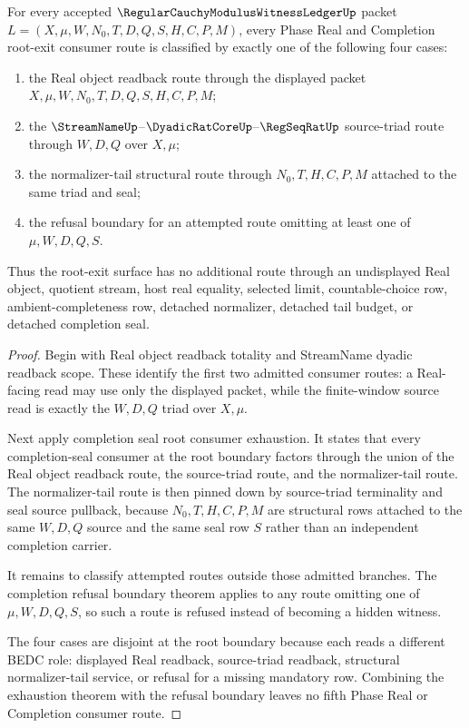 \begin{theorem}
\label{thm:regular-cauchy-modulus-witness-ledger-root-exit-partition}
For every accepted $\RegularCauchyModulusWitnessLedgerUp$ packet $L=(X,\mu,W,N_0,T,D,Q,S,H,C,P,M)$, every Phase Real and Completion root-exit consumer route is classified by exactly one of the following four cases:
\begin{enumerate}
\item the Real object readback route through the displayed packet $X,\mu,W,N_0,T,D,Q,S,H,C,P,M$;
\item the $\StreamNameUp$--$\DyadicRatCoreUp$--$\RegSeqRatUp$ source-triad route through $W,D,Q$ over $X,\mu$;
\item the normalizer-tail structural route through $N_0,T,H,C,P,M$ attached to the same triad and seal;
\item the refusal boundary for an attempted route omitting at least one of $\mu,W,D,Q,S$.
\end{enumerate}
Thus the root-exit surface has no additional route through an undisplayed Real object, quotient stream, host real equality, selected limit, countable-choice row, ambient-completeness row, detached normalizer, detached tail budget, or detached completion seal.
\end{theorem}
\begin{proof}
Begin with Real object readback totality and StreamName dyadic readback scope. These identify the first two admitted consumer routes: a Real-facing read may use only the displayed packet, while the finite-window source read is exactly the $W,D,Q$ triad over $X,\mu$.

Next apply completion seal root consumer exhaustion. It states that every completion-seal consumer at the root boundary factors through the union of the Real object readback route, the source-triad route, and the normalizer-tail route. The normalizer-tail route is then pinned down by source-triad terminality and seal source pullback, because $N_0,T,H,C,P,M$ are structural rows attached to the same $W,D,Q$ source and the same seal row $S$ rather than an independent completion carrier.

It remains to classify attempted routes outside those admitted branches. The completion refusal boundary theorem applies to any route omitting one of $\mu,W,D,Q,S$, so such a route is refused instead of becoming a hidden witness.

The four cases are disjoint at the root boundary because each reads a different BEDC role: displayed Real readback, source-triad readback, structural normalizer-tail service, or refusal for a missing mandatory row. Combining the exhaustion theorem with the refusal boundary leaves no fifth Phase Real or Completion consumer route.
\end{proof}

